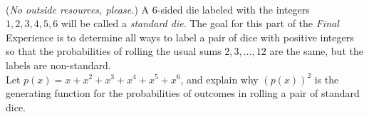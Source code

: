 \documentclass{article}
\begin{document}
\vspace{2em}
\noindent \underline{\hspace{5in}}
\newpage
\vspace{2em}
\\
\noindent(\emph{No outside resources, please.}) A 6-sided die labeled with the integers $1, 2, 3, 4, 5, 6$ will be called a \emph{standard die}.  The goal for this part of the \emph{Final} Experience is to determine all ways to label a pair of dice with positive integers so that the probabilities of rolling the usual sums $2, 3, \dots ,12$ are the same, but the labels are non-standard.  \\
  Let $p(x) = x+x^2+x^3+x^4+x^5+x^6$, and explain why $(p(x))^2$ is the generating function for the probabilities of outcomes in rolling a pair of standard dice.
\end{document}
